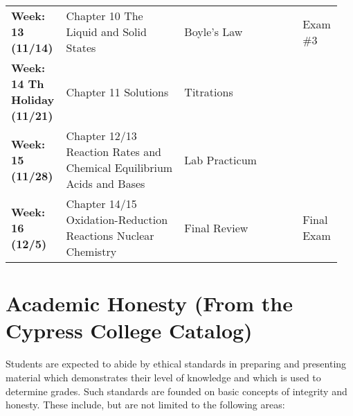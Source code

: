 \documentclass[11pt]{article}
\begin{document}
\begin{table}[H]
\begin{tabular}{|p{0.15\linewidth}|p{0.35\linewidth}|p{0.35\linewidth}|p{0.1\linewidth}|}
  \textbf{Week: 13 (11/14)} & Chapter 10 The Liquid and Solid States & Boyle’s Law & Exam \#3 \\

  \textbf{Week: 14 Th Holiday (11/21)} & Chapter 11 Solutions & Titrations &  \\

  \textbf{Week: 15 (11/28)} & Chapter 12/13 Reaction Rates and Chemical Equilibrium Acids and Bases
  & Lab Practicum &  \\

  \textbf{Week: 16 (12/5)} & Chapter 14/15 Oxidation-Reduction Reactions Nuclear Chemistry
  & Final Review & Final Exam  \\
  \hline
\end{tabular}
\end{table}

\section{Academic Honesty (From the Cypress College Catalog)}

Students are expected to abide by ethical standards in preparing and
presenting material which demonstrates their level of knowledge and which is
used to determine grades. Such standards are founded on basic concepts of
integrity and honesty. These include, but are not limited to the following areas:
\end{document}
